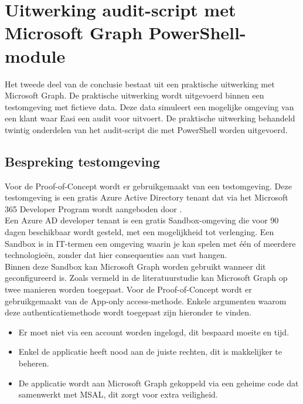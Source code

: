 
\chapter{Uitwerking audit-script met Microsoft Graph PowerShell-module}%
\label{ch:poc}


Het tweede deel van de conclusie bestaat uit een praktische uitwerking met Microsoft Graph. De praktische uitwerking wordt uitgevoerd binnen een testomgeving met fictieve data. Deze data simuleert een mogelijke omgeving van een klant waar Easi een audit voor uitvoert. De praktische uitwerking behandeld twintig onderdelen van het audit-script die met PowerShell worden uitgevoerd.

\section{Bespreking testomgeving}

Voor de Proof-of-Concept wordt er gebruikgemaakt van een testomgeving. Deze testomgeving is een gratis Azure Active Directory tenant dat via het Microsoft 365 Developer Program wordt aangeboden door \textcite{Microsoft2023q}. \\

Een Azure \ac{AD} developer tenant is een gratis Sandbox-omgeving die voor 90 dagen beschikbaar wordt gesteld, met een mogelijkheid tot verlenging. Een Sandbox is in \ac{IT}-termen een omgeving waarin je kan spelen met één of meerdere technologieën, zonder dat hier consequenties aan vast hangen. \\

Binnen deze Sandbox kan Microsoft Graph worden gebruikt wanneer dit  geconfigureerd is. Zoals vermeld in de literatuurstudie kan Microsoft Graph op twee manieren worden toegepast. Voor de Proof-of-Concept wordt er gebruikgemaakt van de App-only access-methode. Enkele argumenten waarom deze authenticatiemethode wordt toegepast zijn hieronder te vinden. 

\begin{itemize}
    \item Er moet niet via een account worden ingelogd, dit bespaard moeite en tijd.
    \item Enkel de applicatie heeft nood aan de juiste rechten, dit is makkelijker te beheren.
    \item De applicatie wordt aan Microsoft Graph gekoppeld via een geheime code dat samenwerkt met \ac{MSAL}, dit zorgt voor extra veiligheid.
\end{itemize}

